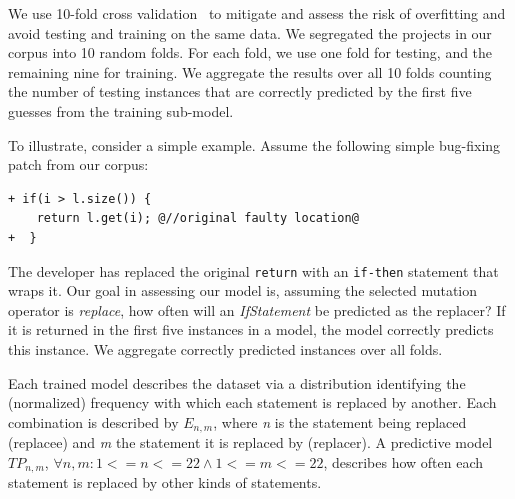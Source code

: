 \documentclass[conference]{IEEEtran}
\begin{document}
We use 
10-fold cross validation~\cite{kohavi95} to mitigate and assess the risk of overfitting and avoid testing and training on
the same data. 
We segregated the projects in our corpus into 10 
random folds. For each 
fold, we use one fold for testing, and the remaining nine for training. We aggregate the results over all 10 folds counting the number of testing instances that are correctly predicted 
by the first five guesses from the training sub-model.   

To illustrate, consider a simple example. Assume the following
simple bug-fixing patch from our corpus: 

\begin{lstlisting}[frame=single]
+ if(i > l.size()) {
    return l.get(i); @//original faulty location@
+  }    
\end{lstlisting}

The developer has replaced the original \texttt{return} with an
\texttt{if-then} statement that wraps it.  Our goal in assessing our model is,
assuming the selected mutation operator 
is \emph{replace}, how often will an \emph{IfStatement} be predicted as the
replacer? If it is returned in the first five instances in a model, the model
correctly predicts this instance. We aggregate correctly predicted instances over all folds.

Each trained model describes the dataset via
a distribution identifying the (normalized) frequency with which each statement is replaced 
by another. Each combination is described by 
$E_{n,m}$, 
where \emph{n} is the statement being replaced (replacee) and \emph{m} the statement it is 
replaced by (replacer).  A predictive model $TP_{n,m}$, $\forall n,m: 1<=n<=22 \land 1<=m<=22$, 
describes how often each statement is replaced by 
other kinds of statements. 


\end{document}

